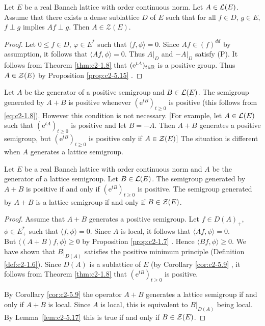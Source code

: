 \begin{lemma}\label{lem:c2-5.17}
%
%
%
Let $E$ be a real Banach lattice with order continuous norm.
Let $A \in \mathcal{L}(E)$.
Assume that there exists a dense sublattice $D$ of $E$ such that for all $f \in D$, $g \in E$, $f \perp g$ implies $Af \perp g$.
Then $A \in \mathcal{Z}(E)$.
\end{lemma}

\begin{proof}
Let $0 \leq f \in D$, $\varphi \in E^*$ such that $\langle f,\phi \rangle = 0$.
Since $Af \in (f)^{dd}$ by assumption, it follows that $\langle Af,\phi \rangle = 0$.
Thus $A|_D$ and $-A|_D$ satisfy (P).
It follows from Theorem \ref{thm:c2-1.8}    that $(\mathrm{e}^{tA})_{t \in \mathbb{R}}$ is a positive group.
Thus $A \in \mathcal{Z}(E)$ by  Proposition \ref{prop:c2-5.15}  .
\end{proof}

Let $A$ be the generator of a positive semigroup and $B \in \mathcal{L}(E)$. 
The semigroup generated by $A + B$ is positive whenever $(\mathrm{e}^{tB})_{t \geq 0}$ is positive (this follows from \ref{eq:c2-1.8}).
However this condition is not
necessary. [For example, let $A \in \mathcal{L}(E)$ such that $(\mathrm{e}^{tA})_{t \geq 0}$ is positive and let $B = -A$.
Then $A + B$ generates a positive semigroup, but $(\mathrm{e}^{tB})_{t \geq 0}$ is positive only if $A \in \mathcal{Z}(E)$]
The situation is different when $A$ generates a lattice semigroup.

\begin{theorem}\label{thm:c2-5.18}
Let $E$ be a real Banach lattice with order continuous norm and $A$ be the generator of a lattice semigroup.
Let $B \in \mathcal{L}(E)$.
The semigroup generated by $A + B$ is positive if and only if $(\mathrm{e}^{tB})_{t \geq 0}$ is positive.
The semigroup generated by $A + B$ is a lattice semigroup if and only if $B \in \mathcal{Z}(E)$.
\end{theorem}

\begin{proof}
Assume that $A + B$ generates a positive semigroup.
Let $f \in D(A)_{+}$, $\phi \in E_{+}^*$ such that $\langle f,\phi \rangle = 0$.
Since $A$ is local, it follows that $\langle Af,\phi \rangle = 0$.\\
But $\langle (A+B)f,\phi \rangle \geq 0$ by  Proposition  \ref{prop:c2-1.7}  .
Hence $\langle Bf,\phi \rangle \geq 0$.
We have shown that $B|_{D(A)}$ satisfies the positive minimum principle (Definition \ref{def:c2-1.6}).
Since $D(A)$ is a sublattice of $E$ (by Corollary \ref{cor:c2-5.9}  , it follows from Theorem \ref{thm:c2-1.8}   that $(\mathrm{e}^{tB})_{t \geq 0}$ is positive.

By Corollary \ref{cor:c2-5.9} the operator $A + B$ generates a lattice semigroup if and only if $A + B$ is local.
Since $A$ is local, this is equivalent to $B|_{D(A)}$ being local.
By Lemma~\ref{lem:c2-5.17} this is true if and only if $B \in \mathcal{Z}(E)$.
\end{proof}

